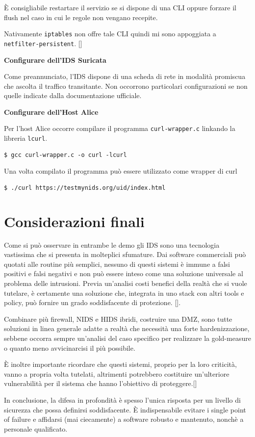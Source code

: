 \documentclass{ldr-article}
\begin{document}
È consigliabile restartare il servizio se si dispone di una CLI oppure forzare il flush nel caso in cui le regole non vengano recepite.

Nativamente \texttt{iptables} non offre tale CLI quindi mi sono appoggiata a \texttt{netfilter-persistent}. [\cite{ask-ubuntu}]

\textbf{Configurare dell'IDS Suricata}

Come preannunciato, l'IDS dispone di una scheda di rete in modalità promiscua che ascolta il traffico transitante. Non occorrono particolari configurazioni se non quelle indicate dalla documentazione ufficiale.

\textbf{Configurare dell'Host Alice}

Per l'host Alice occorre compilare il programma \texttt{curl-wrapper.c} linkando la libreria \texttt{lcurl}.

\begin{lstlisting}
$ gcc curl-wrapper.c -o curl -lcurl
\end{lstlisting}

Una volta compilato il programma può essere utilizzato come wrapper di curl

\begin{lstlisting}
$ ./curl https://testmynids.org/uid/index.html
\end{lstlisting}

\section{Considerazioni finali}

Come si può osservare in entrambe le demo gli IDS sono una tecnologia vastissima che si presenta in molteplici sfumature. Dai software commerciali può quotati alle routine più semplici, nessuno di questi sistemi è immune a falsi positivi e falsi negativi e non può essere inteso come una soluzione universale al problema delle intrusioni. Previa un'analisi costi benefici della realtà che si vuole tutelare, è certamente una soluzione che, integrata in uno stack con altri tools e policy, può fornire un grado soddisfacente di protezione. [\cite{ids-and-firewall}].

Combinare più firewall, NIDS e HIDS ibridi, costruire una DMZ, sono tutte soluzioni in linea generale adatte a realtà che necessità una forte hardenizzazione, sebbene occorra sempre un'analisi del caso specifico per realizzare la gold-measure o quanto meno avvicinarcisi il più possibile.

È inoltre importante ricordare che questi sistemi, proprio per la loro criticità, vanno a propria volta tutelati, altrimenti potrebbero costituire un'ulteriore vulnerabilità per il sistema che hanno l'obiettivo di proteggere.[\cite{onion}]

In conclusione, la difesa in profondità è spesso l'unica risposta per un livello di sicurezza che possa definirsi soddisfacente. È indispensabile evitare i single point of failure e affidarsi (mai ciecamente) a software robusto e mantenuto, nonchè a personale qualificato.

\clearpage
\appendix

\printbibliography
 
\end{document}
